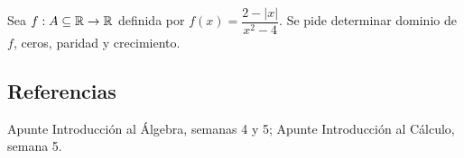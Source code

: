 \begin{ejercicio}
	Sea $f: A \subseteq \mathbb{R} \rightarrow \mathbb{R}$  definida por $f(x) = \dfrac{2 - |x|}{x^2 - 4} $. 
	Se pide determinar dominio de $f$, ceros, paridad y crecimiento.
\end{ejercicio}

\subsection{Referencias}

Apunte Introducción al Álgebra, semanas 4 y 5; Apunte Introducción al Cálculo, semana 5. 